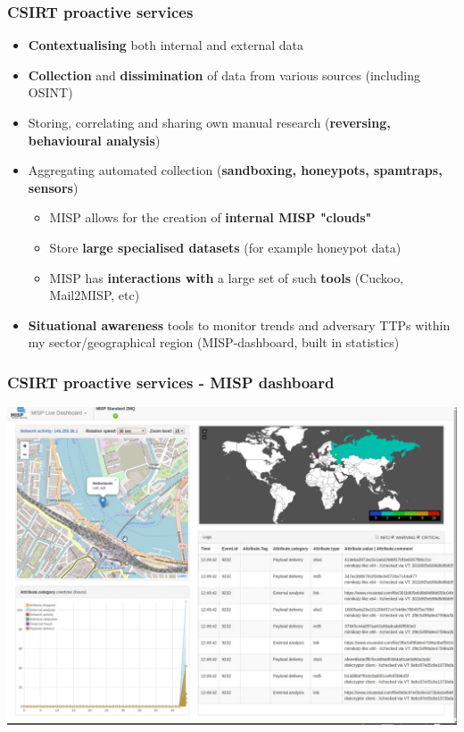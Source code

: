 \begin{frame}
\frametitle{CSIRT proactive services}
\begin{itemize}
	\item {\bf Contextualising} both internal and external data
	\item {\bf Collection} and {\bf dissimination} of data from various sources (including OSINT)
	\item Storing, correlating and sharing own manual research ({\bf reversing, behavioural analysis})
	\item Aggregating automated collection ({\bf sandboxing, honeypots, spamtraps, sensors})
	\begin{itemize}
		\item MISP allows for the creation of {\bf internal MISP "clouds"}
		\item Store {\bf large specialised datasets} (for example honeypot data)
		\item MISP has {\bf interactions with} a large set of such {\bf tools} (Cuckoo, Mail2MISP, etc)
	\end{itemize}
	\item {\bf Situational awareness} tools to monitor trends and adversary TTPs within my sector/geographical region (MISP-dashboard, built in statistics)
\end{itemize}
\end{frame}

\begin{frame}
\frametitle{CSIRT proactive services - MISP dashboard}
\includegraphics[scale=0.18]{screenshots/dashboard-live.png}
\end{frame}

